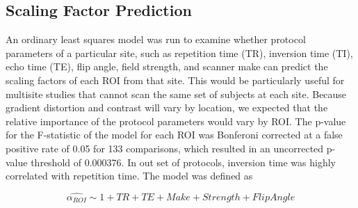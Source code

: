\subsection{Scaling Factor Prediction}

An ordinary least squares model was run to examine whether protocol parameters of a particular site, such as repetition time (TR), inversion time (TI), echo time (TE), flip angle, field strength, and scanner make can predict the scaling factors of each ROI from that site. This would be particularly useful for multisite studies that cannot scan the same set of subjects at each site. Because gradient distortion and contrast will vary by location, we expected that the relative importance of the protocol parameters would vary by ROI. The p-value for the F-statistic of the model for each ROI was Bonferoni corrected at a false positive rate of 0.05 for 133 comparisons, which resulted in an uncorrected p-value threshold of 0.000376. In out set of protocols, inversion time was highly correlated with repetition time. The model was defined as

\begin{equation}

\hat{\alpha_{ROI}} \sim 1 + TR + TE + Make + Strength + FlipAngle

\end{equation}